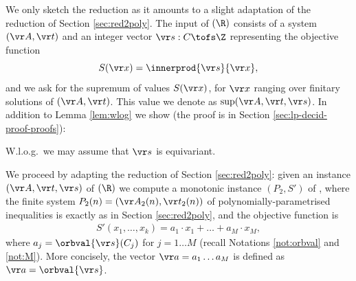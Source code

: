 We only sketch the reduction as it amounts to a slight adaptation of the reduction
 of Section \ref{sec:red2poly}.
The input of \finineqmaxname$(\R)$ consists of a system $(\vr A, \vr t)$ and 
an integer vector $\vr s : C \tofs \Z$ representing
the objective function
\[
S(\vr x) = \innerprod{\vr s}{\vr x},
\]
and we ask for the supremum of values $S(\vr x)$, for $\vr x$ ranging over finitary solutions of $(\vr A, \vr t)$.
This value we denote as $\sup(\vr A, \vr t, \vr s)$.
%
In addition to Lemma \ref{lem:wlog} we show (the proof is in Section \ref{sec:lp-decid-proof-proofs}):
%
\begin{lemma} \label{lem:wlogmax}
W.l.o.g.~we may assume that $\vr s$ is equivariant.
\end{lemma}
%
We proceed by adapting the reduction of Section \ref{sec:red2poly}:
given an instance $(\vr A, \vr t, \vr s)$ of \finineqmaxname$(\R)$ we compute a monotonic instance
 $(P_2, S')$ of \polyineqmaxname, where
the finite system $P_2(n) = (\vr A_2(n), \vr t_2(n))$ of polynomially-parametrised inequalities 
is exactly as in Section \ref{sec:red2poly}, and
the objective function is
%
\begin{align} \label{eq:newobj}
S'(x_1, \ldots, x_k) = a_1 \cdot x_1 + \ldots + a_M \cdot x_M,
\end{align}
%
where $a_j = \orbval{\vr s}(C_j)$ for $j=1\ldots M$
(recall Notations \ref{not:orbval} and \ref{not:M}).
More concisely, the vector $\vr a = a_1 \ldots a_M$ is defined as
$\vr a = \orbval {\vr s}$.
%
